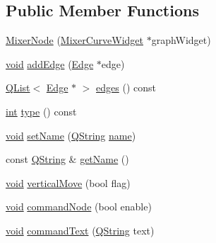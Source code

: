 \subsection*{Public Member Functions}
\begin{DoxyCompactItemize}
\item 
\hyperlink{group___u_a_v_object_widget_utils_gad99e53701553bdb4852ccedd6362f5a2}{Mixer\-Node} (\hyperlink{class_mixer_curve_widget}{Mixer\-Curve\-Widget} $\ast$graph\-Widget)
\item 
\hyperlink{group___u_a_v_objects_plugin_ga444cf2ff3f0ecbe028adce838d373f5c}{void} \hyperlink{group___u_a_v_object_widget_utils_gaf8a1ccdbffed70e2995e75d37c57851c}{add\-Edge} (\hyperlink{class_edge}{Edge} $\ast$edge)
\item 
\hyperlink{class_q_list}{Q\-List}$<$ \hyperlink{class_edge}{Edge} $\ast$ $>$ \hyperlink{group___u_a_v_object_widget_utils_ga40ed4006b807a83e49d061ed3d2660d2}{edges} () const 
\item 
\hyperlink{ioapi_8h_a787fa3cf048117ba7123753c1e74fcd6}{int} \hyperlink{group___u_a_v_object_widget_utils_gab4486e1ba0c3c072c94654c3af32b0c6}{type} () const 
\item 
\hyperlink{group___u_a_v_objects_plugin_ga444cf2ff3f0ecbe028adce838d373f5c}{void} \hyperlink{group___u_a_v_object_widget_utils_gadfd7806c5496ba5afcd31e2965292feb}{set\-Name} (\hyperlink{group___u_a_v_objects_plugin_gab9d252f49c333c94a72f97ce3105a32d}{Q\-String} \hyperlink{glext_8h_ad977737dfc9a274a62741b9500c49a32}{name})
\item 
const \hyperlink{group___u_a_v_objects_plugin_gab9d252f49c333c94a72f97ce3105a32d}{Q\-String} \& \hyperlink{group___u_a_v_object_widget_utils_gade160748ca597706039a14036cf2cf49}{get\-Name} ()
\item 
\hyperlink{group___u_a_v_objects_plugin_ga444cf2ff3f0ecbe028adce838d373f5c}{void} \hyperlink{group___u_a_v_object_widget_utils_ga611004aca7ff8a9568500f208f9e4dd8}{vertical\-Move} (bool flag)
\item 
\hyperlink{group___u_a_v_objects_plugin_ga444cf2ff3f0ecbe028adce838d373f5c}{void} \hyperlink{group___u_a_v_object_widget_utils_ga3eb17fc4cf477877868bb1d9cc4baad9}{command\-Node} (bool enable)
\item 
\hyperlink{group___u_a_v_objects_plugin_ga444cf2ff3f0ecbe028adce838d373f5c}{void} \hyperlink{group___u_a_v_object_widget_utils_ga549e0ca95a0402dfc301e141de9e269e}{command\-Text} (\hyperlink{group___u_a_v_objects_plugin_gab9d252f49c333c94a72f97ce3105a32d}{Q\-String} text)
\item 

\end{DoxyCompactItemize}
